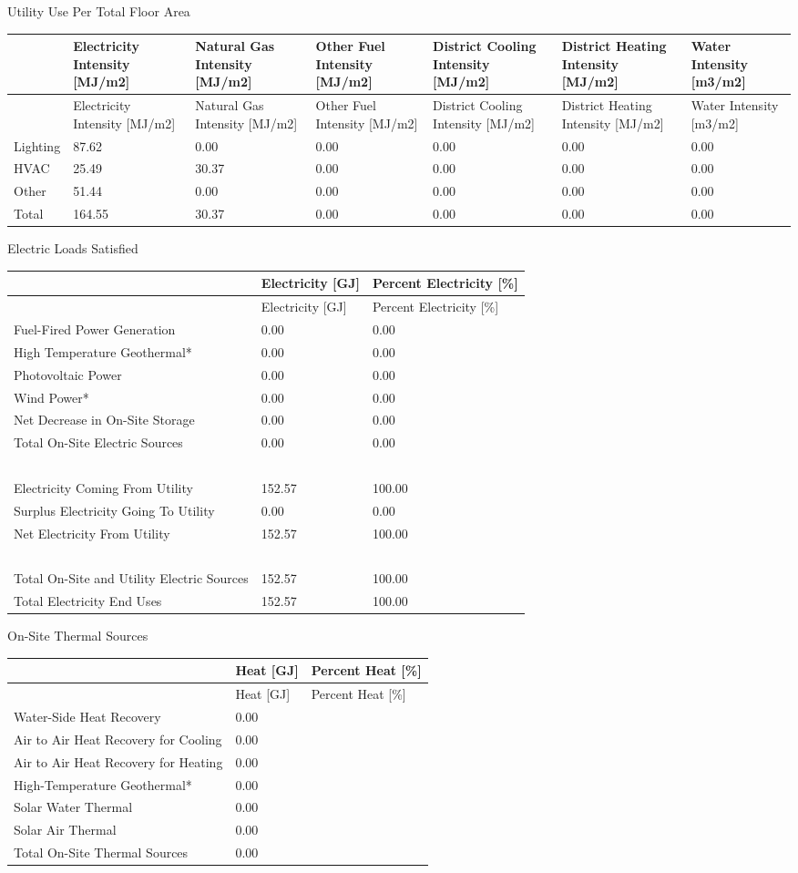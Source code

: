 Utility Use Per Total Floor Area

\begin{longtable}[c]{>{\raggedright}p{0.85in}>{\raggedright}p{0.85in}>{\raggedright}p{0.85in}p{0.85in}p{0.85in}p{0.85in}p{0.85in}}
\toprule
~ & Electricity Intensity [MJ/m2] & Natural Gas Intensity [MJ/m2] & Other Fuel Intensity [MJ/m2] & District Cooling Intensity [MJ/m2] & District Heating Intensity [MJ/m2] & Water Intensity [m3/m2] \tabularnewline
\midrule
\endfirsthead

\toprule
~ & Electricity Intensity [MJ/m2] & Natural Gas Intensity [MJ/m2] & Other Fuel Intensity [MJ/m2] & District Cooling Intensity [MJ/m2] & District Heating Intensity [MJ/m2] & Water Intensity [m3/m2] \tabularnewline
\midrule
\endhead

Lighting & 87.62 & 0.00 & 0.00 & 0.00 & 0.00 & 0.00 \tabularnewline
HVAC & 25.49 & 30.37 & 0.00 & 0.00 & 0.00 & 0.00 \tabularnewline
Other & 51.44 & 0.00 & 0.00 & 0.00 & 0.00 & 0.00 \tabularnewline
Total & 164.55 & 30.37 & 0.00 & 0.00 & 0.00 & 0.00 \tabularnewline
\bottomrule
\end{longtable}

Electric Loads Satisfied

\begin{longtable}[c]{>{\raggedright}p{2.9in}p{1.5in}p{1.59in}}
\toprule
~ & Electricity [GJ] & Percent Electricity [\%] \tabularnewline
\midrule
\endfirsthead

\toprule
~ & Electricity [GJ] & Percent Electricity [\%] \tabularnewline
\midrule
\endhead

Fuel-Fired Power Generation & 0.00 & 0.00 \tabularnewline
High Temperature Geothermal* & 0.00 & 0.00 \tabularnewline
Photovoltaic Power & 0.00 & 0.00 \tabularnewline
Wind Power* & 0.00 & 0.00 \tabularnewline
Net Decrease in On-Site Storage & 0.00 & 0.00 \tabularnewline
Total On-Site Electric Sources & 0.00 & 0.00 \tabularnewline
~ & ~ & ~ \tabularnewline
Electricity Coming From Utility & 152.57 & 100.00 \tabularnewline
Surplus Electricity Going To Utility & 0.00 & 0.00 \tabularnewline
Net Electricity From Utility & 152.57 & 100.00 \tabularnewline
~ & ~ & ~ \tabularnewline
Total On-Site and Utility Electric Sources & 152.57 & 100.00 \tabularnewline
Total Electricity End Uses & 152.57 & 100.00 \tabularnewline
\bottomrule
\end{longtable}

On-Site Thermal Sources

\begin{longtable}[c]{@{}lll@{}}
\toprule
~ & Heat [GJ] & Percent Heat [\%] \tabularnewline
\midrule
\endfirsthead

\toprule
~ & Heat [GJ] & Percent Heat [\%] \tabularnewline
\midrule
\endhead

Water-Side Heat Recovery & 0.00 & ~ \tabularnewline
Air to Air Heat Recovery for Cooling & 0.00 & ~ \tabularnewline
Air to Air Heat Recovery for Heating & 0.00 & ~ \tabularnewline
High-Temperature Geothermal* & 0.00 & ~ \tabularnewline
Solar Water Thermal & 0.00 & ~ \tabularnewline
Solar Air Thermal & 0.00 & ~ \tabularnewline
Total On-Site Thermal Sources & 0.00 & ~ \tabularnewline
\bottomrule
\end{longtable}


